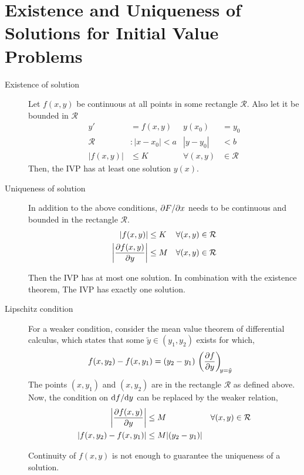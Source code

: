 \section{Existence and Uniqueness of Solutions for Initial Value Problems}

\begin{description}
    \item[Existence of solution] Let $ f(x, y) $ be continuous at all points in some rectangle
        $ \mathcal{R} $. Also let it be bounded in $ \mathcal{R} $
        \begin{align}
            y'          & = f(x, y)         & y(x_{0})           & = y_{0}         \\
            \mathcal{R} & : |x - x_{0}| < a & |y - y_{0}|        & < b             \\
            |f(x, y)|   & \leq K            & \forall     (x, y) & \in \mathcal{R}
        \end{align}
        Then, the IVP has at least one solution $ y(x) $.

    \item[Uniqueness of solution] In addition to the above conditions, $ \difsp Fx $ needs
        to be continuous and bounded in the rectangle $ \mathcal{R} $.
        \begin{align}
            |f(x, y)|                         & \leq K & \forall     (x, y) & \in \mathcal{R} \\
            \left| \diffp{f(x, y)}{y} \right| & \leq M & \forall     (x, y) & \in \mathcal{R}
        \end{align}

        Then the IVP has at most one solution. In combination with the existence theorem,
        The IVP has exactly one solution.
    \item[Lipschitz condition] For a weaker condition, consider the mean value theorem
        of differential calculus, which states that some $ \tilde{y} \in (y_{1}, y_{2})$
        exists for which,
        \begin{align}
            f(x, y_{2}) - f(x, y_{1}) & = (y_{2} - y_{1})\ \diffp fy[y = \tilde{y}]
        \end{align}
        The points $ (x, y_{1}) $ and $ (x, y_{2}) $ are in the rectangle $ \mathcal{R} $ as
        defined above. Now, the condition on $ \difs fy $ can be replaced by the weaker relation,
        \begin{align}
            \left| \diffp{f(x, y)}{y} \right|        & \leq M               & \forall     (x, y) & \in \mathcal{R} \\
            \left| f(x, y_{2}) - f(x, y_{1}) \right| & \leq M |(y_{2} - y_{1})|
        \end{align}

        Continuity of $ f(x, y) $ is not enough to guarantee the uniqueness of a solution.
\end{description}
